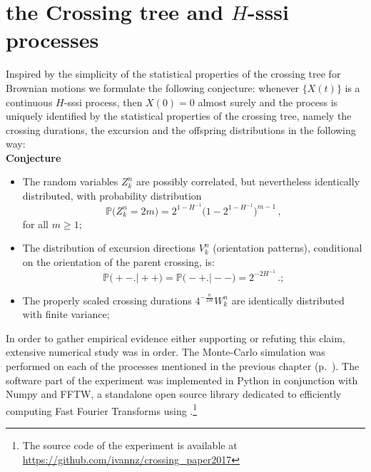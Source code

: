 \documentclass[a4paper]{article}
\newcommand{\pr}{\mathbb{P}}
\newcommand{\Dcal}{\mathcal{D}}
\begin{document}

\section{the Crossing tree and $H$-sssi processes} %
\label{sec:experiment}

Inspired by the simplicity of the statistical properties of the crossing tree for
Brownian motions we formulate the following conjecture: whenever $\{X(t)\}$ is a
continuous $H$-sssi process, then $X(0)= 0$ almost surely and the process is uniquely
identified by the statistical properties of the crossing tree, namely the crossing
durations, the excursion and the offspring distributions in the following way:\\
\noindent \textbf{Conjecture}\begin{itemize}
    \item The random variables $Z_k^n$ are possibly correlated, but nevertheless
    identically distributed, with probability distribution
    \[ \pr\bigl(Z_k^n=2m\bigr) = 2^{1-H^{-1}}\bigl(1-2^{1-H^{-1}}\bigr)^{m-1} \,,\]
    for all $m\geq 1$;
    \item The distribution of excursion directions $V_k^n$ (orientation patterns),
    conditional on the orientation of the parent crossing, is:
    \[ \pr\bigl( +- \bigr.\bigl\lvert ++ \bigr)
	= \pr\bigl( -+ \bigr.\bigl\lvert -- \bigr)
	= 2^{-2H^{-1}} \,.; \]
	\item The properly scaled crossing durations $4^{-\frac{n}{2H}} W_k^n$
	are identically distributed with finite variance;
\end{itemize}

In order to gather empirical evidence either supporting or refuting this claim,
extensive numerical study was in order. The Monte-Carlo simulation was performed
on each of the processes mentioned in the previous chapter (p.~\pageref{sec:self_sim_processes}).
The software part of the experiment was implemented in Python in conjunction with
Numpy and FFTW, a standalone open source library dedicated to efficiently computing
Fast Fourier Transforms using .\footnote{The source code of the experiment is available
at \url{https://github.com/ivannz/crossing_paper2017}}
\end{document}
